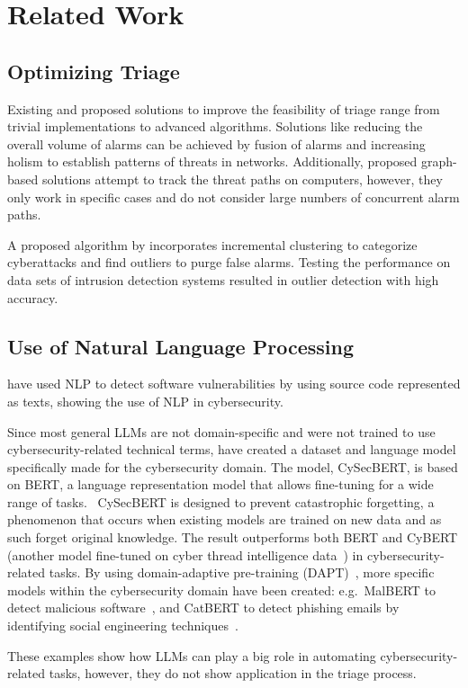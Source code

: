 \section{Related Work}
\label{sec:related-work}

\subsection{Optimizing Triage}
\label{subsec:optimizing-triage}

Existing and proposed solutions to improve the feasibility of triage range from trivial implementations to advanced
algorithms.
Solutions like reducing the overall volume of alarms can be achieved by fusion of alarms and increasing holism to
establish patterns of threats in networks.
Additionally, proposed graph-based solutions attempt to track the threat paths on computers, however, they only work
in specific cases and do not consider large numbers of concurrent alarm paths.\ \citep{ficke2022reconstructing}

A proposed algorithm by \citet{taheri2020cyberattack} incorporates incremental clustering to categorize cyberattacks
and find outliers to purge false alarms.
Testing the performance on data sets of intrusion detection systems resulted in outlier detection with high accuracy.

\subsection{Use of Natural Language Processing}
\label{subsec:use-of-natural-language-processing}

\citet{singh2022cyber} have used NLP to detect software vulnerabilities by using source code represented as texts,
showing the use of NLP in cybersecurity.

Since most general LLMs are not domain-specific and were not trained to use cybersecurity-related technical terms,
\citet{bayer2024cysecbert} have created a dataset and language model specifically made for the cybersecurity domain.
The model, CySecBERT, is based on BERT, a language representation model that allows fine-tuning for a wide range of
tasks.\ \citep{devlin2018bert}
CySecBERT is designed to prevent catastrophic forgetting, a phenomenon that occurs when existing models are trained on
new data and as such forget original knowledge.
The result outperforms both BERT and CyBERT (another model fine-tuned on cyber thread intelligence data\ \citep{ranade2021cybert})
in cybersecurity-related tasks.
By using domain-adaptive pre-training (DAPT)\ \citep{gururangan2020don}, more specific models within the cybersecurity
domain have been created: e.g.\ MalBERT to detect malicious software\ \citep{rahali2021malbert}, and CatBERT to detect
phishing emails by identifying social engineering techniques\ \citep{lee2020catbert}.

These examples show how LLMs can play a big role in automating cybersecurity-related tasks, however, they do not show
application in the triage process.